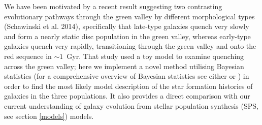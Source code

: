 \documentclass[useAMS,usenatbib]{mn2e}
\begin{document}
We have been motivated by a recent result suggesting two contrasting evolutionary pathways through the green valley by different morphological types (Schawinski et al. 2014), specifically that late-type galaxies quench very slowly and form a nearly static disc population in the green valley, whereas early-type galaxies quench very rapidly, transitioning through the green valley and onto the red sequence in $\sim 1$~Gyr. That study used a toy model to examine quenching across the green valley; here we implement a novel method utilising Bayesian statistics (for a comprehensive overview of Bayesian statistics see either \citealt{MacKay} or \citealt{Sivia}) in order to find the most likely model description of the star formation histories of galaxies in the three populations. It also provides a direct comparison with our current understanding of galaxy evolution from stellar population synthesis (SPS, see section \ref{models}) models. 
\end{document}

